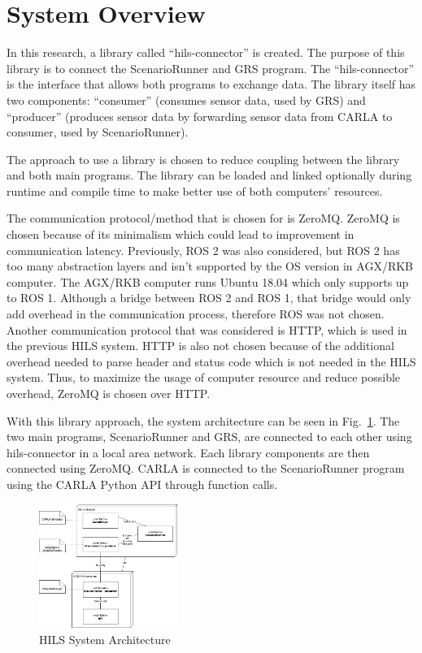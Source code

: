 \section{System Overview}

In this research, a library called ``hils-connector'' is created. The purpose of
this library is to connect the ScenarioRunner and GRS program. The
``hils-connector'' is the interface that allows both programs to exchange data.
The library itself has two components: ``consumer'' (consumes sensor data, used
by GRS) and ``producer'' (produces sensor data by forwarding sensor data from
CARLA to consumer, used by ScenarioRunner).

The approach to use a library is chosen to reduce coupling between the library
and both main programs. The library can be loaded and linked optionally during
runtime and compile time to make better use of both computers' resources.

The communication protocol/method that is chosen for is ZeroMQ. ZeroMQ is chosen
because of its minimalism which could lead to improvement in communication
latency. Previously, ROS 2 was also considered, but ROS 2 has too many
abstraction layers and isn't supported by the OS version in AGX/RKB computer.
The AGX/RKB computer runs Ubuntu 18.04 which only supports up to ROS 1. Although
a bridge between ROS 2 and ROS 1, that bridge would only add overhead in the
communication process, therefore ROS was not chosen. Another communication
protocol that was considered is HTTP, which is used in the previous HILS system.
HTTP is also not chosen because of the additional overhead needed to parse
header and status code which is not needed in the HILS system. Thus, to maximize
the usage of computer resource and reduce possible overhead, ZeroMQ is chosen
over HTTP.

With this library approach, the system architecture can be seen in
Fig.~\ref{section-3-hils-deployment-diagram}. The two main programs,
ScenarioRunner and GRS, are connected to each other using hils-connector in a
local area network. Each library components are then connected using ZeroMQ.
CARLA is connected to the ScenarioRunner program using the CARLA Python API
through function calls.

\begin{figure}[htbp]
	\centerline{\includegraphics[width=0.4\textwidth]{resources/chapter-3/deployment-diagram-new-hils-EN.png}}
	\caption{HILS System Architecture}
	\label{section-3-hils-deployment-diagram}
\end{figure}

